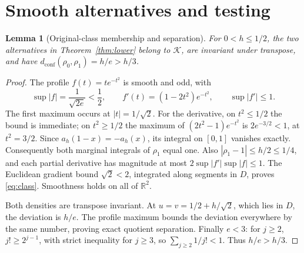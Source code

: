 \documentclass[11pt]{article}
\newtheorem{lemma}[theorem]{Lemma}
\theoremstyle{remark}
\newcommand{\R}{\mathbb R}
\newcommand{\K}{\mathcal K}
\newcommand{\dc}{d_{\mathrm{conf}}}
\begin{document}
\section{Smooth alternatives and testing}
\label{sec:lowerproof}
\begin{lemma}[Original-class membership and separation]\label{lem:alternatives}
For $0<h\le1/2$, the two alternatives in Theorem~\ref{thm:lower}
belong to $\K$, are invariant under transpose, and have
$\dc(\rho_0,\rho_1)=h/e>h/3$.
\end{lemma}
\begin{proof}
The profile $f(t)=te^{-t^2}$ is smooth and odd, with
\[
 \sup|f|=\frac1{\sqrt{2e}}<\frac12,\qquad
 f'(t)=(1-2t^2)e^{-t^2},\qquad \sup|f'|\le1.
\]
The first maximum occurs at $|t|=1/\sqrt2$. For the derivative,
on $t^2\le1/2$ the bound is immediate; on $t^2\ge1/2$ the maximum
of $(2t^2-1)e^{-t^2}$ is $2e^{-3/2}<1$, at $t^2=3/2$.
Since $a_h(1-x)=-a_h(x)$, its integral on $[0,1]$ vanishes exactly.
Consequently both marginal integrals of $\rho_1$ equal one.
Also $|\rho_1-1|\le h/2\le1/4$, and each partial derivative has
magnitude at most $2\sup|f'|\sup|f|\le1$.
The Euclidean gradient bound $\sqrt2<2$, integrated along segments
in $D$, proves \eqref{eq:class}. Smoothness holds on all of $\R^2$.

Both densities are transpose invariant. At
$u=v=1/2+h/\sqrt2$, which lies in $D$, the deviation is $h/e$.
The profile maximum bounds the deviation everywhere by the same
number, proving exact quotient separation.
Finally $e<3$: for $j\ge2$, $j!\ge2^{j-1}$, with strict inequality
for $j\ge3$, so $\sum_{j\ge2}1/j!<1$. Thus $h/e>h/3$.
\end{proof}
\end{document}
